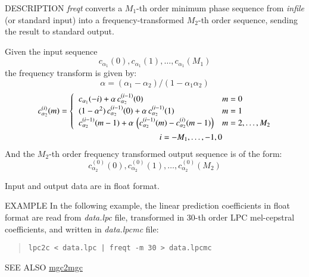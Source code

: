 \begin{synopsis}
\item [freqt] [ --m $M_1$ ] [ --M $M_2$ ] [ --a $A_1$ ] [ --A $A_2$ ]
	      [ {\em infile} ]
\end{synopsis}

\begin{qsection}{DESCRIPTION}
{\em freqt} converts a $M_1$-th order minimum phase sequence 
from {\em infile} (or standard input) 
into a frequency-transformed $M_2$-th order sequence,
sending the result to standard output.

Given the input sequence
\begin{displaymath}
c_{\alpha_1}(0), c_{\alpha_1}(1), \dots, c_{\alpha_1}(M_1)
\end{displaymath}
the frequency transform is given by:
\begin{displaymath}
   \alpha = (\alpha_1 - \alpha_2) / (1 - \alpha_1 \alpha_2)
\end{displaymath}
\begin{align} 
c_{\alpha_2}^{(i)}(m) &=  
	\begin{cases}
          \;\; c_{\alpha_1}(-i)
	    +\alpha\,c_{\alpha_2}^{(i-1)}(0) &  m=0 \\
          \;\; (1-\alpha^2)\,c_{\alpha_2}^{(i-1)}(0)
            +\alpha\,c_{\alpha_2}^{(i-1)}(1) &  m=1 \\
          \;\; c_{\alpha_2}^{(i-1)}(m-1) 
	    +\alpha\, \left(c_{\alpha_2}^{(i-1)}(m)
	    -c_{\alpha_2}^{(i)}(m-1)\right) &   m=2,\dots,M_2
         \end{cases} \notag \\
& \qquad\qquad\qquad\qquad\qquad\qquad i = -M_1,\dots,-1,0 
\end{align}
And the $M_2$-th order frequency transformed output sequence is of the form:
\begin{displaymath}
c_{\alpha_2}^{(0)}(0), c_{\alpha_2}^{(0)}(1), \dots, c_{\alpha_2}^{(0)}(M_2)
\end{displaymath}
\par
Input and output data are in float format.
\end{qsection}

\begin{options}
\end{options}

\begin{qsection}{EXAMPLE}
In the following example, the linear prediction coefficients in
float format are read from {\em data.lpc} file, 
transformed in 30-th order LPC mel-cepstral coefficients,
and written in {\em data.lpcmc} file:
\begin{quote}
 \verb!lpc2c < data.lpc | freqt -m 30 > data.lpcmc!
\end{quote} 
\end{qsection}

\begin{qsection}{SEE ALSO}
\hyperlink{mgc2mgc}{mgc2mgc}
\end{qsection}
